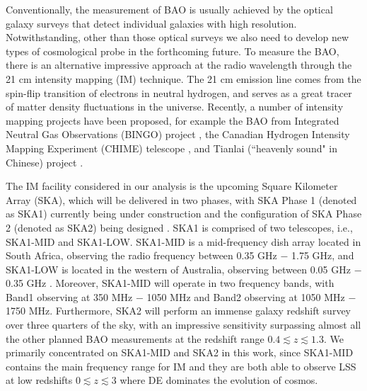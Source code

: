 \documentclass[aps,prd,amsmath,amssymb,showpacs,floats,floatfix,nofootinbib,reprint]{revtex4-1}
\begin{document}
Conventionally, the measurement of BAO is usually achieved by the optical galaxy surveys that detect individual galaxies with high resolution. Notwithstanding, other than those optical surveys we also need to develop new types of cosmological probe in the forthcoming future. To measure the BAO, there is an alternative impressive approach at the radio wavelength through the 21 cm intensity mapping (IM) technique. The 21 cm emission line comes from the spin-flip transition of electrons in neutral hydrogen, and serves as a great tracer of matter density fluctuations in the universe.
Recently, a number of intensity mapping projects have been proposed, for example the BAO from Integrated Neutral Gas Observations (BINGO) project \cite{Battye:2012tg}, the Canadian Hydrogen Intensity Mapping Experiment (CHIME) telescope \cite{Bandura:2014gwa}, and Tianlai (``heavenly sound" in Chinese) project \cite{Chen:2012xu}. 

The IM facility considered in our analysis is the upcoming Square Kilometer Array (SKA), which will be delivered in two phases, with SKA Phase 1 (denoted as SKA1) currently being under construction and the configuration of SKA Phase 2 (denoted as SKA2) being designed \cite{Bacon:2018dui}. SKA1 is comprised of two telescopes, i.e., SKA1-MID and SKA1-LOW. SKA1-MID is a mid-frequency dish array located in South Africa, observing the radio frequency between 0.35 GHz $-$ 1.75 GHz, and SKA1-LOW is located in the western of Australia, observing between 0.05 GHz $-$ 0.35 GHz \cite{Bacon:2018dui}. Moreover, SKA1-MID will operate in two frequency bands, with Band1 observing at 350 MHz $-$ 1050 MHz and Band2 observing at 1050 MHz $-$ 1750 MHz.  Furthermore, SKA2 will perform an immense galaxy redshift survey over three quarters of the sky, with an impressive sensitivity surpassing almost all the other planned BAO measurements at the redshift range $0.4 \lesssim z \lesssim 1.3$.  We primarily concentrated on SKA1-MID and SKA2 in this work, since SKA1-MID contains the main frequency range for IM and they are both able to observe LSS at low redshifts $0\lesssim z \lesssim 3$ where DE dominates the evolution of cosmos.
\end{document}
